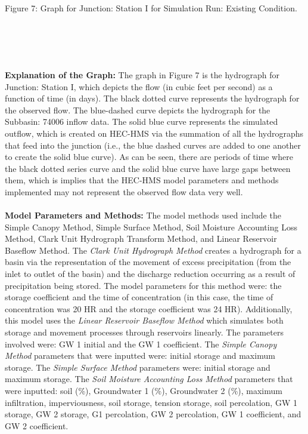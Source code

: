 \documentclass[]{article}
\begin{document}
\begin{enumerate}[label=\textbf{\arabic*.}]
\begin{minipage}[t]{\linewidth}
	\medskip
	\begin{center} 
		Figure 7: Graph for Junction: Station I for Simulation Run: Existing Condition.
	\end{center}
\end{minipage} \\ \\ \\ \\
 \noindent \textbf{Explanation of the Graph:} The graph in Figure 7 is the hydrograph for Junction: Station I, which depicts the flow (in cubic feet per second) as a function of time (in days). The black dotted curve represents the hydrograph for the observed flow. The blue-dashed curve depicts the hydrograph for the Subbasin: 74006 inflow data. The solid blue curve represents the simulated outflow, which is created on HEC-HMS via the summation of all the hydrographs that feed into the junction (i.e., the blue dashed curves are added to one another to create the solid blue curve). As can be seen, there are periods of time where the black dotted series curve and the solid blue curve have large gaps between them, which is implies that the HEC-HMS model parameters and methods implemented may not represent the observed flow data very well. \\ \\ 
 \textbf{Model Parameters and Methods:} The model methods used include the Simple Canopy Method, Simple Surface Method, Soil Moisture Accounting Loss Method, Clark Unit Hydrograph Transform Method, and Linear Reservoir Baseflow Method. The \textit{Clark Unit Hydrograph Method} creates a hydrograph for a basin via the representation of the movement of excess precipitation (from the inlet to outlet of the basin) and the discharge reduction occurring as a result of precipitation being stored. The model parameters for this method were: the storage coefficient and the time of concentration (in this case, the time of concentration was 20 HR and the storage coefficient was 24 HR). Additionally, this model uses the \textit{Linear Reservoir Baseflow Method} which simulates both storage and movement processes through reservoirs linearly. The parameters involved were: GW 1 initial and the GW 1 coefficient. The \textit{Simple Canopy Method} parameters that were inputted were: initial storage and maximum storage. The \textit{Simple Surface Method} parameters were: initial storage and maximum storage. The \textit{Soil Moisture Accounting Loss Method} parameters that were inputted: soil (\%), Groundwater 1 (\%), Groundwater 2 (\%), maximum infiltration, imperviousness, soil storage, tension storage, soil percolation, GW 1 storage, GW 2 storage, G1 percolation, GW 2 percolation, GW 1 coefficient, and GW 2 coefficient.   \\ \\

\end{enumerate}
\end{document}
